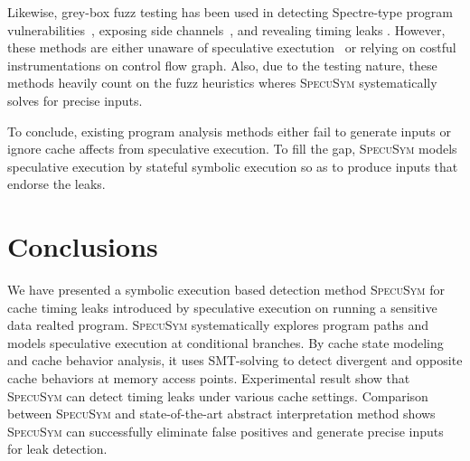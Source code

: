 \documentclass[sigconf, review]{acmart}
\newcommand{\SpecuSym}{\textsc{SpecuSym} }
\begin{document}
Likewise, grey-box fuzz testing has been used in detecting Spectre-type
\cite{KocherGGHHLMPSY19} program vulnerabilities~\cite{OleksenkoTSF19}, 
exposing side channels~\cite{NilizadehNP19}, and revealing timing leaks
\cite{HeEC19}. However, these methods are either unaware of speculative 
exectution~\cite{NilizadehNP19,HeEC19} or relying on costful 
instrumentations on control flow graph. Also, due to the testing nature, 
these methods heavily count on the fuzz heuristics wheres \SpecuSym 
systematically solves for precise inputs.


To conclude, existing program analysis methods either fail to generate 
inputs or ignore cache affects from speculative execution. To fill the 
gap, \SpecuSym models speculative execution by stateful symbolic 
execution so as to produce inputs that endorse the leaks. 


\section{Conclusions}
\label{sec:conclusion}



We have presented a symbolic execution based detection method \SpecuSym
for cache timing leaks introduced by speculative execution on running 
a sensitive data realted program. \SpecuSym systematically explores
program paths and models speculative execution at conditional branches.
By cache state modeling and cache behavior analysis, it uses SMT-solving
to detect divergent and opposite cache behaviors at memory access points.
Experimental result show that \SpecuSym can detect timing leaks under
various cache settings. Comparison between \SpecuSym and state-of-the-art
abstract interpretation method shows \SpecuSym can successfully eliminate 
false positives and generate precise inputs for leak detection.


\clearpage\newpage


%

\end{document}
